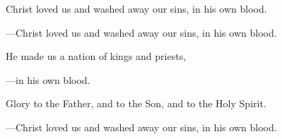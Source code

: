 \responsory
\begin{hangpar}

Christ loved us and washed away our sins, in his own blood.

{\color{red}---\thinspace}Christ loved us and washed away our sins, in his own blood.

\medskip He made us a nation of kings and priests,

{\color{red}---\thinspace}in his own blood.

\medskip Glory to the Father, and to the Son, and to the Holy Spirit.

{\color{red}---\thinspace}Christ loved us and washed away our sins, in his own blood.
\end{hangpar}
